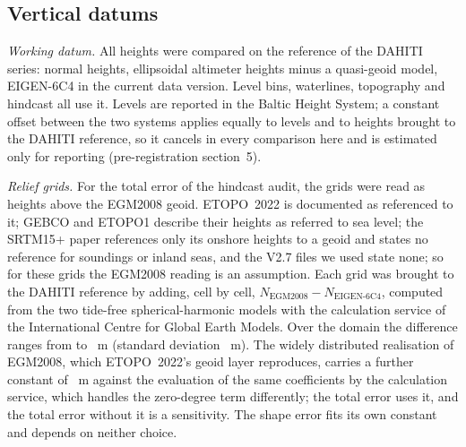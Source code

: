 
\subsection*{Vertical datums}
\emph{Working datum.} All heights were compared on the reference of the DAHITI series: normal heights, ellipsoidal altimeter heights minus a quasi-geoid model\citep{schwatke2015}, EIGEN-6C4 in the current data version\citep{dahiti_wl,forste2014}. Level bins, waterlines, topography and hindcast all use it. Levels are reported in the Baltic Height System; a constant offset between the two systems applies equally to levels and to heights brought to the DAHITI reference, so it cancels in every comparison here and is estimated only for reporting (pre-registration section~5).

\emph{Relief grids.} For the total error of the hindcast audit, the grids were read as heights above the EGM2008 geoid\citep{pavlis2012}. ETOPO~2022 is documented as referenced to it\citep{macferrin2025}; GEBCO and ETOPO1 describe their heights as referred to sea level\citep{gebco2026,amante2009}; the SRTM15+ paper references only its onshore heights to a geoid and states no reference for soundings or inland seas\citep{tozer2019}, and the V2.7 files we used state none; so for these grids the EGM2008 reading is an assumption. Each grid was brought to the DAHITI reference by adding, cell by cell, $N_{\mathrm{EGM2008}} - N_{\mathrm{EIGEN\text{-}6C4}}$, computed from the two tide-free spherical-harmonic models with the calculation service of the International Centre for Global Earth Models\citep{ince2019}. Over the domain the difference ranges from  to ~m (standard deviation ~m). The widely distributed realisation of EGM2008, which ETOPO~2022's geoid layer reproduces, carries a further constant of ~m against the evaluation of the same coefficients by the calculation service, which handles the zero-degree term differently\citep{geographiclib_gravity,icgem_faq}; the total error uses it, and the total error without it is a sensitivity. The shape error fits its own constant and depends on neither choice.

